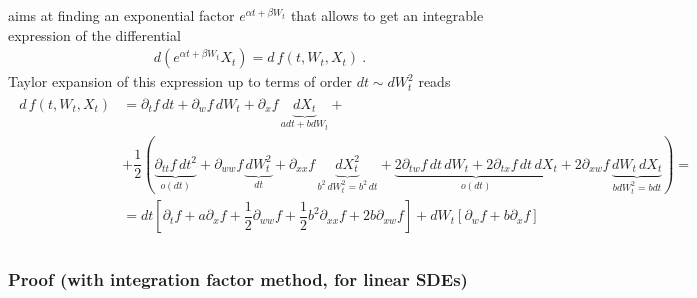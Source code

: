 \documentclass[letterpaper,10pt,english]{jupyterBook}
\begin{document}
\sphinxAtStartPar
aims at finding an exponential factor \(e^{\alpha t + \beta W_t}\) that allows to get an integrable expression of the differential
\begin{equation*}
\begin{split}d \left( e^{\alpha t + \beta W_t} X_t \right) = d \, f\left( t, W_t, X_t \right) \ .\end{split}
\end{equation*}
\sphinxAtStartPar
Taylor expansion of this expression up to terms of order \(dt \sim dW_t^2\) reads
\begin{equation*}
\begin{split}\begin{aligned}
  d \, f(t,W_t,X_t)
  & = \partial_t f \, dt + \partial_w f \, d W_t + \partial_x f \, \underbrace{dX_t}_{a dt + b dW_t} + \\
  & + \dfrac{1}{2} \left( \underbrace{\partial_{tt} f \, dt^2}_{o(dt)} + \partial_{ww} f \, \underbrace{dW_t^2}_{dt} + \partial_{xx}  f\, \underbrace{dX_t^2}_{b^2 \, dW_t^2 = b^2 \, dt} + \underbrace{2 \partial_{tw} f \, dt \, dW_t + 2 \partial_{tx} f \, dt \, dX_t}_{o(dt)} + 2 \partial_{xw} f \, \underbrace{dW_t \, dX_t}_{b dW_t^2 = b dt}  \right) = \\
  & = dt \left[ \partial_t f + a \partial_x f + \dfrac{1}{2} \partial_{ww} f + \dfrac{1}{2} b^2 \partial_{xx} f + 2 b \partial_{xw} f \right] + d W_t \left[ \partial_w f + b \partial_x f \right] \\
\end{aligned}\end{split}
\end{equation*}\subsubsection*{Proof (with integration factor method, for linear SDEs)}
\end{document}
